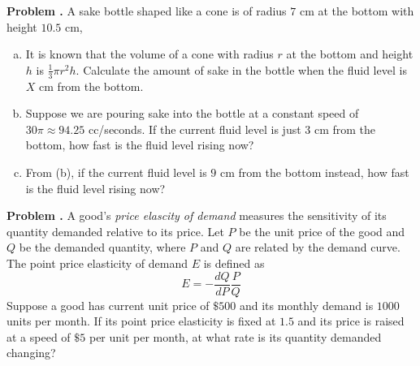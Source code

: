 \documentclass[11pt,letterpaper]{article}
\newcounter{problem}
\newcommand{\problem}{
	\stepcounter{problem}%
	\noindent \textbf{Problem \theproblem. }%
}
\begin{document}
\problem A sake bottle shaped like a cone is of radius $7$ cm at the bottom with height $10.5$ cm,
\begin{enumerate}[(a)]
    \item It is known that the volume of a cone with radius $r$ at the bottom and height $h$ is $\frac{1}{3}\pi r^2 h$.  Calculate the amount of sake in the bottle when the fluid level is $X$ cm from the bottom.
    \item Suppose we are pouring sake into the bottle at a constant speed of $30 \pi \approx 94.25$ cc/seconds.  If the current fluid level is just $3$ cm from the bottom, how fast is the fluid level rising now?
    \item From (b), if the current fluid level is $9$ cm from the bottom instead, how fast is the fluid level rising now?
\end{enumerate}\vspace{6mm}

\problem A good's \textit{price elascity of demand} measures the sensitivity of its quantity demanded relative to its price.  Let $P$ be the unit price of the good and $Q$ be the demanded quantity, where $P$ and $Q$ are related by the demand curve.  The point price elasticity of demand $E$ is defined as 
\[E = -\frac{dQ}{dP}\frac{P}{Q}\]
Suppose a good has current unit price of $\$500$ and its monthly demand is $1000$ units per month. If its point price elasticity is fixed at $1.5$ and its price is raised at a speed of $\$5$ per unit per month, at what rate is its quantity demanded changing?
\vspace{6mm}

\end{document}
